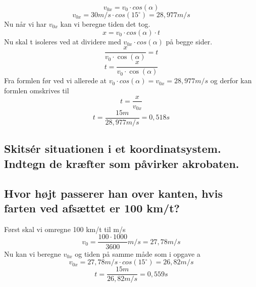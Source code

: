 \begin{equation*}
    v_{0x}=v_{0}\cdot cos(\alpha)
\end{equation*}
\begin{equation*}
    v_{0x}=30m/s\cdot cos(15^{\circ}) = 28,977 m/s
\end{equation*}
Nu når vi har \begin{math}v_{0x}\end{math} kan vi beregne tiden det tog.
\begin{equation*}
    x=v_{0}\cdot cos(\alpha)\cdot t
\end{equation*}
Nu skal t isoleres ved at dividere med \begin{math}v_{0x}\cdot cos(\alpha)\end{math} på begge sider.
\begin{equation*}
    \frac{x}{v_{0}\cdot \cos(\alpha)}=t
\end{equation*}
\begin{equation*}
    t=\frac{x}{v_{0}\cdot \cos(\alpha)}
\end{equation*}
Fra formlen før ved vi allerede at \begin{math}v_{0}\cdot cos(\alpha) = v_{0x} = 28,977m/s\end{math} og derfor kan formlen omskrives til
\begin{equation*}
    t=\frac{x}{v_{0x}}
\end{equation*}
\begin{equation*}
    t=\frac{15m}{28,977m/s} = 0,518 s
\end{equation*}



\subsection{Skitsér situationen i et koordinatsystem. Indtegn de kræfter som påvirker akrobaten.}


\subsection{Hvor højt passerer han over kanten, hvis farten ved afsættet er 100 km/t?}
Først skal vi omregne 100 km/t til m/s
\begin{equation*}
    v_{0}=\frac{100\cdot 1000}{3600}m/s = 27,78m/s
\end{equation*}
Nu kan vi beregne \begin{math}v_{0x}\end{math} og tiden på samme måde som i opgave a
\begin{equation*}
    v_{0x}=27,78m/s\cdot cos(15^{\circ}) = 26,82 m/s
\end{equation*}
\begin{equation*}
    t=\frac{15m}{26,82m/s} = 0,559 s
\end{equation*}

